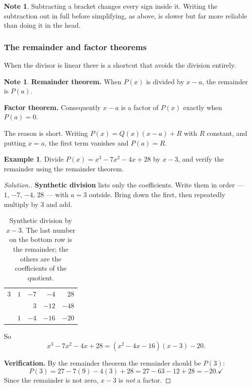 \documentclass[11pt,a4paper]{article}
\theoremstyle{definition}
\newtheorem{example}[thm]{Example}
\newtheorem{note}[thm]{Note}
\newenvironment{solution}
  {\renewcommand{\qedsymbol}{}\begin{proof}[\textit{Solution}.]}
  {\end{proof}}
\let\amscheckmark\checkmark
\renewcommand{\checkmark}{\ensuremath{\amscheckmark}}
\begin{document}
\begin{note}
Subtracting a bracket changes every sign inside it. Writing the subtraction out in full
before simplifying, as above, is slower but far more reliable than doing it in the head.
\end{note}

\subsubsection{The remainder and factor theorems}

When the divisor is linear there is a shortcut that avoids the division entirely.

\begin{note}
\textbf{Remainder theorem.} When $P(x)$ is divided by $x-a$, the remainder is $P(a)$.

\textbf{Factor theorem.} Consequently $x-a$ is a factor of $P(x)$ exactly when
$P(a)=0$.
\end{note}

The reason is short. Writing $P(x)=Q(x)(x-a)+R$ with $R$ constant, and putting $x=a$,
the first term vanishes and $P(a)=R$.

\begin{example}
Divide $P(x)=x^3-7x^2-4x+28$ by $x-3$, and verify the remainder using the remainder
theorem.
\end{example}

\begin{solution}
\textbf{Synthetic division} lists only the coefficients. Write them in order --- $1$,
$-7$, $-4$, $28$ --- with $a=3$ outside. Bring down the first, then repeatedly multiply
by $3$ and add.
\begin{table}[H]
\centering
\begin{tabular}{|c|r|r|r|r|}
\hline
$3$ & $1$ & $-7$ & $-4$ & $28$\\
 &  & $3$ & $-12$ & $-48$\\
\hline
 & $1$ & $-4$ & $-16$ & $-20$\\
\hline
\end{tabular}
\caption{Synthetic division by $x-3$. The last number on the bottom row is the remainder; the others are the coefficients of the quotient.}
\end{table}
So
$$x^3-7x^2-4x+28=\left(x^2-4x-16\right)(x-3)-20.$$

\textbf{Verification.} By the remainder theorem the remainder should be $P(3)$:
$$P(3)=27-7(9)-4(3)+28=27-63-12+28=-20. \checkmark$$
Since the remainder is not zero, $x-3$ is \emph{not} a factor.
\end{solution}
\end{document}
